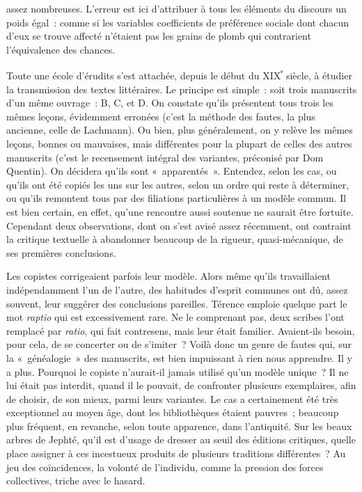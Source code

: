 \documentclass[french,twoside]{book} %
\begin{document}
\label{p62} assez nombreuses. L’erreur est ici d’attribuer à tous les éléments du discours un poids égal : comme si les variables coefficients de préférence sociale dont chacun d’eux se trouve affecté n’étaient pas les grains de plomb qui contrarient l’équivalence des chances.\par
Toute une école d’érudits s’est attachée, depuis le début du XIX\textsuperscript{ᵉ} siècle, à étudier la transmission des textes littéraires. Le principe est simple : soit trois manuscrits d’un même ouvrage : B, C, et D. On constate qu’ils présentent tous trois les mêmes leçons, évidemment erronées (c’est la méthode des fautes, la plus ancienne, celle de Lachmann). Ou bien, plus généralement, on y relève les mêmes leçons, bonnes ou mauvaises, mais différentes pour la plupart de celles des autres manuscrits (c’est le recen­sement intégral des variantes, préconisé par Dom Quentin). On décidera qu’ils sont « apparentés ». Entendez, selon les cas, ou qu’ils ont été copiés les uns sur les autres, selon un ordre qui reste à déterminer, ou qu’ils remontent tous par des filiations particulières à un modèle commun. Il est bien certain, en effet, qu’une rencontre aussi soutenue ne saurait être fortuite. Cependant deux observations, dont on s’est avisé assez récemment, ont contraint la critique textuelle à abandonner beaucoup de la rigueur, quasi-mécanique, de ses premières conclusions.\par
Les copistes corrigeaient parfois leur modèle. Alors même qu’ils tra­vaillaient indépendamment l’un de l’autre, des habitudes d’esprit com­munes ont dû, assez souvent, leur suggérer des conclusions pareilles. Térence emploie quelque part le mot \emph{raptio} qui est excessivement rare. Ne le comprenant pas, deux scribes l’ont remplacé par \emph{ratio}, qui fait contresens, mais leur était familier. Avaient‑ils besoin, pour cela, de se concerter ou de s’imiter ? Voilà donc un genre de fautes qui, sur la « géné­alogie » des manuscrits, est bien impuissant à rien nous apprendre. Il y a plus. Pourquoi le copiste n’aurait‑il jamais utilisé qu’un modèle unique ? Il ne lui était pas interdit, quand il le pouvait, de confronter plusieurs exemplaires, afin de choisir, de son mieux, parmi leurs variantes. Le cas a certainement été très exceptionnel au moyen âge, dont les bibliothèques étaient pauvres ; beaucoup plus fréquent, en revanche, selon toute appa­rence, dans l’antiquité. Sur les beaux arbres de Jephté, qu’il est d’usage de dresser au seuil des éditions critiques, quelle place assigner à ces inces­tueux produits de plusieurs traditions différentes ? Au jeu des coïncidences, la volonté de l’individu, comme la pression des forces collectives, triche avec le hasard.\par
\end{document}

